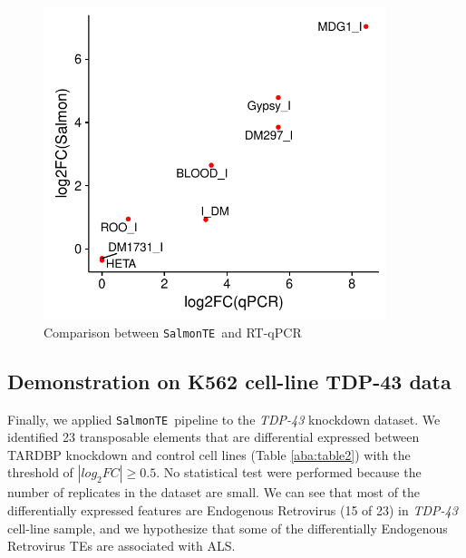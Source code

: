 \documentclass[wsdraft]{ws-procs11x85}
\newcommand{\SalmonTE}{\texttt{SalmonTE}}
\begin{document}
\begin{figure}[h]
\centerline{
\includegraphics[width=10cm]{supp_fig3_corr}
}
\caption{Comparison between \SalmonTE~and RT-qPCR}
\label{aba:fig4}
\end{figure}

\subsection{Demonstration on K562 cell-line TDP-43 data}

Finally, we applied \SalmonTE~pipeline to the \textit{TDP-43} knockdown dataset.
We identified 23 transposable elements that are differential expressed between TARDBP knockdown and control cell lines (Table \ref{aba:table2}) with the threshold of $|log_{2}FC| \geq 0.5$. No statistical test were performed because the number of replicates in the dataset are small. 
% 
% 
% 
%
We can see that most of the differentially expressed features are Endogenous Retrovirus (15 of 23) in \textit{TDP-43} cell-line sample, and we hypothesize that some of the differentially Endogenous Retrovirus TEs are associated with ALS.
% 
% 
% 
%
\end{document}

